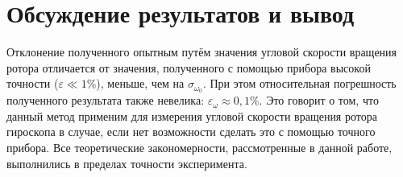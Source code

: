 \documentclass[a4paper,12pt]{article} %
\begin{document}
\section{Обсуждение результатов и вывод}

Отклонение полученного опытным путём значения угловой скорости вращения ротора отличается от значения, полученного с помощью прибора высокой точности ($ \varepsilon \ll 1\% $), меньше, чем на $ \sigma_{\omega_0} $. При этом относительная погрешность полученного результата также невелика: $ \varepsilon_\omega \approx 0,1 \% $. Это говорит о том, что данный метод применим для измерения угловой скорости вращения ротора гироскопа в случае, если нет возможности сделать это с помощью точного прибора. Все теоретические закономерности, рассмотренные в данной работе, выполнились в пределах точности эксперимента.
\end{document}
